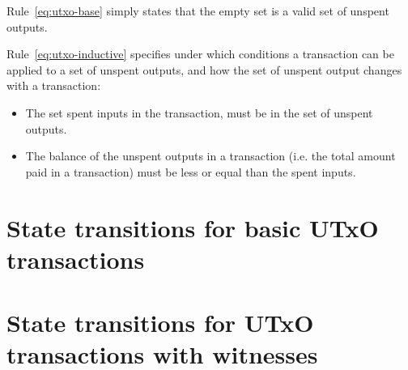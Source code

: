 \documentclass[11pt,a4paper]{article}
\begin{document}
Rule~\ref{eq:utxo-base} simply states that the empty set is a valid set of
unspent outputs.

Rule~\ref{eq:utxo-inductive} specifies under which conditions a transaction can
be applied to a set of unspent outputs, and how the set of unspent output changes
with a transaction:
\begin{itemize}
\item The set spent inputs in the transaction, must be in the set of unspent
  outputs.
\item The balance of the unspent outputs in a transaction (i.e. the total
  amount paid in a transaction) must be less or equal than the spent
  inputs.
\end{itemize}

\section{State transitions for basic UTxO transactions}
\label{sec:state-trans-basic}

\section{State transitions for UTxO transactions with witnesses}
\label{sec:state-trans-utxo}
\end{document}

